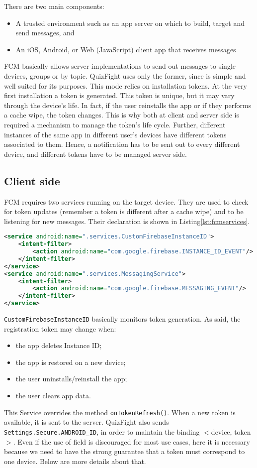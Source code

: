 There are two main components:
\begin{itemize}
	\item A trusted environment such as an app server on which to build, target and send messages, and
	\item An iOS, Android, or Web (JavaScript) client app that receives messages
\end{itemize}
FCM basically allows server implementations to send out messages to single devices, groups or by topic. QuizFight uses only the former, since is simple and well suited for its purposes. This mode relies on installation tokens. At the very first installation a token is generated. This token is unique, but it may vary through the device's life. In fact, if the user reinstalls the app or if they performs a cache wipe, the token changes. This is why both at client and server side is required a mechanism to manage the token's life cycle. Further, different instances of the same app in different user's devices have different tokens associated to them. Hence, a notification has to be sent out to every different device, and different tokens have to be managed server side.

\subsection{Client side}
FCM requires two services running on the target device. They are used to check for token updates (remember a token is different after a cache wipe) and to be listening for new messages. Their declaration is shown in Listing\ref{lst:fcmservices}.
\begin{lstlisting}[language=xml, caption={FCM Services}, label={lst:fcmservices}]
<service android:name=".services.CustomFirebaseInstanceID">
	<intent-filter>
		<action android:name="com.google.firebase.INSTANCE_ID_EVENT"/>
	</intent-filter>
</service>
<service android:name=".services.MessagingService">
	<intent-filter>
		<action android:name="com.google.firebase.MESSAGING_EVENT"/>
	</intent-filter>
</service>
\end{lstlisting}

\texttt{CustomFirebaseInstanceID} basically monitors token generation. As said, the registration token may change when:
\begin{itemize}
	\item the app deletes Instance ID;
	\item the app is restored on a new device;
	\item the user uninstalls/reinstall the app;
	\item the user clears app data.
\end{itemize}
This Service overrides the method \texttt{onTokenRefresh()}. When a new token is available, it is sent to the server. QuizFight also sends \\\texttt{Settings.Secure.ANDROID\_ID}, in order to maintain the binding $<$device, token$>$. Even if the use of field is discouraged for most use cases, here it is necessary because we need to have the strong guarantee that a token must correspond to one device. Below are more details about that.

